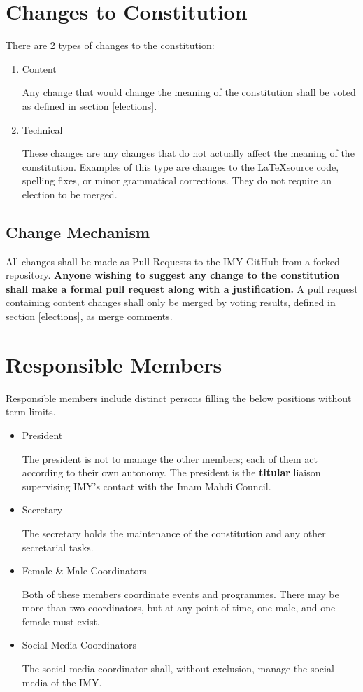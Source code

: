 \documentclass{article}
\begin{document}
\section{Changes to Constitution}
\label{changes}
There are
2
types of changes to the constitution:
\begin{enumerate}
      \item Content

            Any change that would change the meaning of the constitution shall be voted as defined in section
            \ref{elections}.
      \item Technical

            These changes are any changes that do not actually affect the meaning of the constitution.
            Examples of this type are changes to  the \LaTeX source code, spelling fixes, or minor grammatical corrections.
            They do not require an election to be merged.
\end{enumerate}

\subsection{Change Mechanism}
\label{change_mechanism}
All changes shall be made as Pull Requests to the IMY GitHub from a forked repository.
\textbf{Anyone wishing to suggest any change to the constitution shall make a formal pull request along with a justification.}
A pull request containing content changes shall only be merged by voting results, defined in section \ref{elections}, as merge comments.

\section{Responsible Members}
\label{responsible_members}
Responsible members include distinct persons filling the below positions without term limits.
\begin{itemize}
      \item President

            The president is not to manage the other members; each of them act according to their own autonomy.
            The president is the \textbf{titular} liaison supervising IMY's contact with the Imam Mahdi Council.
      \item Secretary

            The secretary holds the maintenance of the constitution and any other secretarial tasks.
      \item Female \& Male Coordinators

            Both of these members coordinate events and programmes.
            There may be more than two coordinators, but at any point of time, one male, and one female must exist.

      \item Social Media Coordinators

            The social media coordinator shall, without exclusion, manage the social media of the IMY.
\end{itemize}
\end{document}
